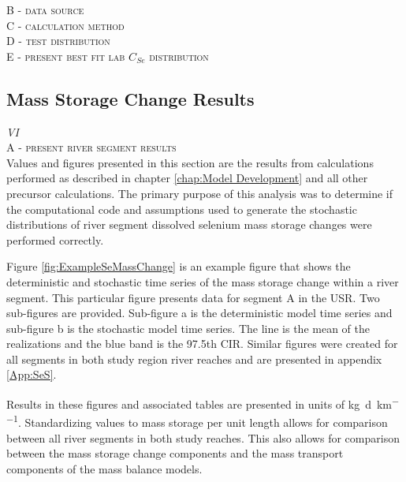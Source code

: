 \begin{linenumbers}
\textsc{B - data source}\\

\textsc{C - calculation method}\\

\textsc{D - test distribution}\\

\textsc{E - present best fit lab $C_{Se}$ distribution}\\

\clearpage{}
\subsection{Mass Storage Change Results}
\emph{VI}\\

\textsc{A - present river segment results}\\

Values and figures presented in this section are the results from calculations performed as described in chapter \ref{chap:Model Development} and all other precursor calculations.  The primary purpose of this analysis was to determine if the computational code and assumptions used to generate the stochastic distributions of river segment dissolved selenium mass storage changes were performed correctly.

Figure \ref{fig:ExampleSeMassChange} is an example figure that shows the deterministic and stochastic time series of the mass storage change within a river segment.  This particular figure presents data for segment A in the USR.  Two sub-figures are provided.  Sub-figure a is the deterministic model time series and sub-figure b is the stochastic model time series.  The line is the mean of the realizations and the blue band is the 97.5th CIR.  Similar figures were created for all segments in both study region river reaches and are presented in appendix \ref{App:SeS}.

Results in these figures and associated tables are presented in units of \si{\kilo\gram\per\day\per\kilo\meter}.  Standardizing values to mass storage per unit length allows for comparison between all river segments in both study reaches.  This also allows for comparison between the mass storage change components and the mass transport components of the mass balance models.


\end{linenumbers}
